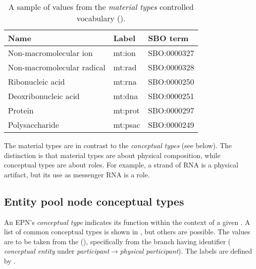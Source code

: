 \begin{table}[h]
  \centering
  \begin{tabular}{l>{\ttfamily}l>{\ttfamily}l}
    \toprule
    \textbf{Name}              & \textbf{\rmfamily Label} & \textbf{\rmfamily SBO term} \\
    \midrule
    Non-macromolecular ion     & mt:ion  & SBO:0000327\\
    Non-macromolecular radical & mt:rad  & SBO:0000328\\
    Ribonucleic acid           & mt:rna  & SBO:0000250\\
    Deoxribonucleic acid       & mt:dna  & SBO:0000251\\
    Protein                    & mt:prot & SBO:0000297\\
    Polysaccharide             & mt:psac & SBO:0000249\\
    \bottomrule
  \end{tabular}
  \caption{A sample of values from the \emph{material types} controlled
    vocabulary ().}
  \label{tab:material-types-cv}
\end{table}

The material types are in contrast to the \emph{conceptual types} (see below).  The distinction is that material types are about physical composition, while conceptual types are about roles.  For example, a strand of RNA is a physical artifact, but its use as messenger RNA is a role.


\subsection{Entity pool node conceptual types}
\label{sec:conceptual-types-cv}

An EPN's \emph{conceptual type} indicates its function within the context of a given \PD.  A list of common conceptual types is shown in , but others are possible.  The values are to be taken from the \sbo (\sbourl), specifically from the branch having identifier  ($\!$\emph{conceptual entity} under \emph{participant}$\rightarrow$\emph{physical participant}).  The labels are defined by \SBGNPDLone.

